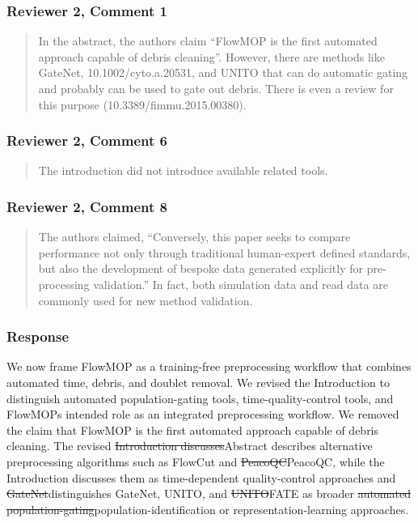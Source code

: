 \documentclass[
  11pt,
  a4paper,
]{article}
\begin{document}
\subsubsection{Reviewer 2, Comment 1}\label{reviewer-2-comment-1}

\begin{quote}
In the abstract, the authors claim ``FlowMOP is the first automated
approach capable of debris cleaning''. However, there are methods like
GateNet, 10.1002/cyto.a.20531, and UNITO that can do automatic gating
and probably can be used to gate out debris. There is even a review for
this purpose (10.3389/fimmu.2015.00380).
\end{quote}

\subsubsection{Reviewer 2, Comment 6}\label{reviewer-2-comment-6}

\begin{quote}
The introduction did not introduce available related tools.
\end{quote}

\subsubsection{Reviewer 2, Comment 8}\label{reviewer-2-comment-8}

\begin{quote}
The authors claimed, ``Conversely, this paper seeks to compare
performance not only through traditional human-expert defined standards,
but also the development of bespoke data generated explicitly for
pre-processing validation.'' In fact, both simulation data and read data
are commonly used for new method validation.
\end{quote}

\subsubsection{Response}\label{response}

We now frame FlowMOP as a training-free preprocessing workflow that
combines automated time, debris, and doublet removal. We revised the
Introduction to distinguish automated population-gating tools,
time-quality-control tools, and FlowMOP\textquotesingle s intended role
as an integrated preprocessing workflow. We removed the claim that
FlowMOP is the first automated approach capable of debris cleaning. The
revised {\color{revisionred}\sout{Introduction
discusses}}{\color{revisionblue}Abstract describes alternative
preprocessing algorithms such as} FlowCut and
{\color{revisionred}\sout{PeacoQC}}{\color{revisionblue}PeacoQC, while
the Introduction discusses them} as time-dependent quality-control
approaches and
{\color{revisionred}\sout{GateNet}}{\color{revisionblue}distinguishes
GateNet, UNITO,} and
{\color{revisionred}\sout{UNITO}}{\color{revisionblue}FATE} as broader
{\color{revisionred}\sout{automated
population-gating}}{\color{revisionblue}population-identification or
representation-learning} approaches.
\end{document}
